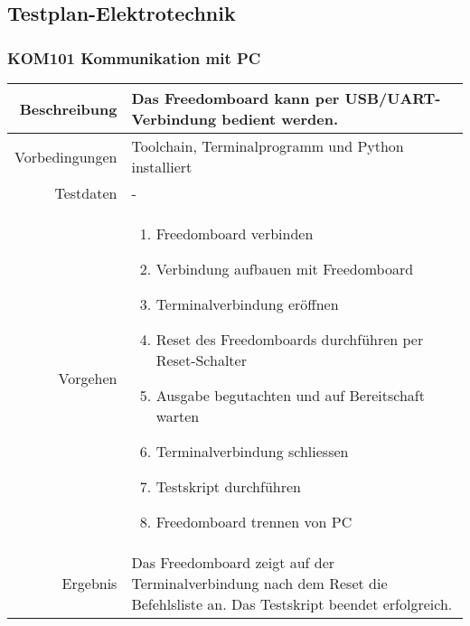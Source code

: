 \subsection{Testplan-Elektrotechnik}
\subsubsection{KOM101 Kommunikation mit PC}
\begin{table}[h!]
	\renewcommand{\arraystretch}{1.5}
	\begin{tabular}{|r|p{14cm}|}
		\hline Beschreibung	&
			Das Freedomboard kann per USB/UART-Verbindung bedient werden. \\ 
		\hline Vorbedingungen	&
			Toolchain, Terminalprogramm und Python installiert \\ 
		\hline Testdaten	& - \\ 
		\hline Vorgehen		& 
		\begin{enumerate}
			\item Freedomboard verbinden
			\item Verbindung aufbauen mit Freedomboard
			\item Terminalverbindung eröffnen
			\item Reset des Freedomboards durchführen per Reset-Schalter
			\item Ausgabe begutachten und auf Bereitschaft warten
			\item Terminalverbindung schliessen
			\item Testskript durchführen
			\item Freedomboard trennen von PC 
		\end{enumerate} \\ 
		\hline Ergebnis 	&
			Das Freedomboard zeigt auf der Terminalverbindung nach dem
			Reset die Befehlsliste an. Das Testskript beendet erfolgreich.\\ 
		\hline 
	\end{tabular}
\end{table}

\newpage
